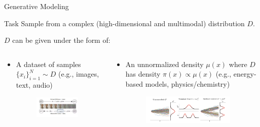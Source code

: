 \documentclass[aspectratio=169,xcolor=dvipsnames]{beamer}
\begin{document}
\begin{frame}[t]{Generative Modeling}
\scriptsize
\begin{block}{Task}
    Sample from a complex (high-dimensional and multimodal) distribution $D$.
\end{block}

$D$ can be given under the form of:

\begin{columns}[t]
\begin{column}{0.48\textwidth}
\begin{itemize}\itemsep2pt
    \item A dataset of samples $\{x_i\}_{i=1}^N \sim D$ (e.g., images, text, audio)
    \begin{figure}
        \centering
        \includegraphics[width=0.9\textwidth]{figures/score_diffusion.png}
    \end{figure}
\end{itemize}
\end{column}
\begin{column}{0.48\textwidth}
\begin{itemize}\itemsep2pt
    \item An unnormalized density $\mu(x)$ where $D$ has density $\pi(x) \propto \mu(x)$ (e.g., 
    energy-based models, physics/chemistry)
    \begin{figure}
        \centering
        \includegraphics[width=0.9\textwidth]{figures/unconctrolled.png}
    \end{figure}
\end{itemize}
\end{column}
\end{columns}

\end{frame}
\end{document}

